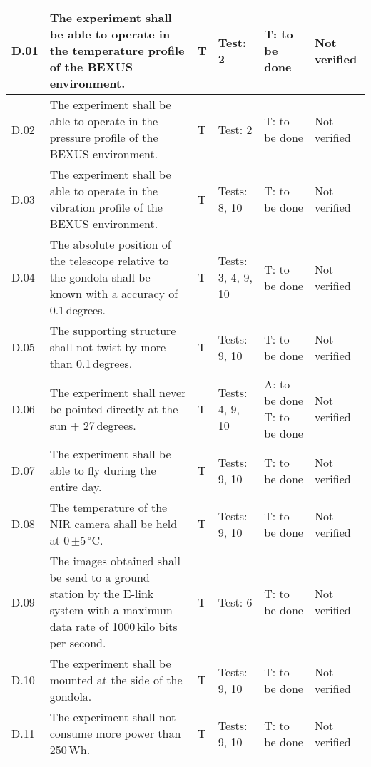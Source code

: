 \begin{longtable}[]{|m{}| m{}|m{}|m{}|m{}|m{}|}
D.01 & The experiment shall be able to operate in the temperature profile of the BEXUS environment.
& T & Test: 2 & T: to be done & Not verified \\\hline

D.02 & The experiment shall be able to operate in the pressure profile of the BEXUS environment.
& T & Test: 2  & T: to be done & Not verified \\\hline

D.03 & The experiment shall be able to operate in the vibration profile of the BEXUS environment.
& T & Tests: 8, 10 & T: to be done & Not verified \\\hline

D.04 & The absolute position of the telescope relative to the gondola shall be known with a accuracy of 0.1\,degrees.
& T & Tests: 3, 4, 9, 10 & T: to be done & Not verified \\\hline

D.05 & The supporting structure shall not twist by more than 0.1\,degrees.
& T & Tests: 9, 10 & T: to be done & Not verified \\\hline

D.06 & The experiment shall never be pointed directly at the sun $\pm$ 27\,degrees.
& T & Tests: 4, 9, 10 & A: to be done \newline T: to be done & Not verified \\\hline

D.07 & The experiment shall be able to fly during the entire day.
& T & Tests: 9, 10 & T: to be done & Not verified \\\hline

D.08 & The temperature of the NIR camera shall be held at 0\,$\pm$5\,$^\circ$C.
& T & Tests: 9, 10 & T: to be done & Not verified \\\hline

D.09 & The images obtained shall be send to a ground station by the E-link system with a maximum data rate of 1000\,kilo bits per second.
& T & Test: 6 & T: to be done & Not verified \\\hline

D.10 & The experiment shall be mounted at the side of the gondola.
& T & Tests: 9, 10 & T: to be done & Not verified \\\hline

D.11 & The experiment shall not consume more power than 250\,Wh.
& T & Tests: 9, 10 & T: to be done & Not verified \\\hline



\end{longtable}
